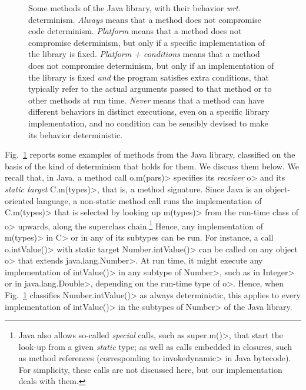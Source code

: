\begin{figure}[t]
\begin{center}
{\begin{tabular}{|l||C{1cm}|C{1.25cm}|C{1.57cm}|C{1cm}|}
    \end{tabular}}
  \end{center}
  \caption{Some methods of the Java library, with their behavior \emph{wrt.} determinism.
\emph{Always} means that a method does not compromise code determinism.
\emph{Platform} means that
a method does not compromise determinism, but only if a specific implementation
of the library is fixed. \emph{Platform + conditions} means that a method
does not compromise determinism, but only if an implementation of the library is fixed
\emph{and} the program satisfies extra conditions, that typically refer to
the actual arguments passed to that method or to other methods at run time.
\emph{Never} means
that a method can have different behaviors in distinct executions,
even on a specific library implementation, and no
condition can be sensibly devised to make its behavior deterministic.}\label{fig:determinism}
\end{figure}

Fig.~\ref{fig:determinism} reports some examples of methods
from the Java library, classified
on the basis of the kind of determinism that holds for them.
We discuss them below. We recall that, in Java, a method call
\<o.m(pars)> specifies its \emph{receiver} \<o> and
its \emph{static target} \<C.m(types)>, that is, a method signature.
Since Java is an object-oriented language,
a non-static method call runs the implementation of \<C.m(types)>
that is selected by looking up \<m(types)> from the run-time class of \<o> upwards,
along the superclass chain.\footnote{Java also allows so-called \emph{special} calls, such as
   \<super.m()>, that start the look-up from a given \emph{static}
   type; as well as calls embedded in closures, such as method references
   (corresponding to \<invokedynamic> in Java bytecode). For simplicity,
   these calls are not discussed here, but our implementation deals with them.}
Hence, any implementation of \<m(types)> in \<C> or in any of its
subtypes can be run. For instance, a call \<o.intValue()> with static target \<Number.intValue()>
can be called on any object \<o> that extends
\<java.lang.Number>. At run time, it might
execute any implementation of \<intValue()> in any subtype of \<Number>,
such as in \<Integer> or in \<java.lang.Double>, depending on the run-time type of \<o>.
Hence, when Fig.~\ref{fig:determinism} classifies \<Number.intValue()> as always
deterministic, this applies to every implementation of
\<intValue()> in the subtypes of \<Number> of the Java library.

